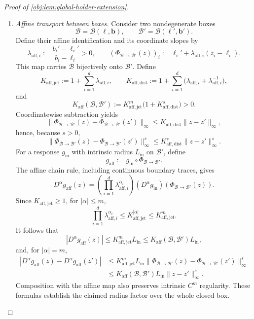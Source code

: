 \begin{proof}[Proof of \cref{obj:lem:global-holder-extension}]
\begin{enumerate}
\item\label{proof:global-holder-extension:affine-transport} \emph{Affine transport between boxes.}
Consider two nondegenerate boxes
\[
\mathcal B=\mathcal B(\boldsymbol\ell,\boldsymbol b),
\qquad
\mathcal B'=\mathcal B(\boldsymbol\ell',\boldsymbol b').
\]
Define their affine identification and its coordinate slopes by
\[
\lambda_{\mathrm{aff},i}
:=\frac{b_i'-\ell_i'}{b_i-\ell_i}>0,
\qquad
(\Phi_{\mathcal B\to\mathcal B'}(z))_i
:=\ell_i'+\lambda_{\mathrm{aff},i}(z_i-\ell_i).
\]
This map carries \(\mathcal B\) bijectively onto \(\mathcal B'\). Define
\[
K_{\mathrm{aff},\mathrm{jet}}
:=1+\sum_{i=1}^d\lambda_{\mathrm{aff},i},
\qquad
K_{\mathrm{aff},\mathrm{dist}}
:=1+\sum_{i=1}^d
\bigl(\lambda_{\mathrm{aff},i}+\lambda_{\mathrm{aff},i}^{-1}\bigr),
\]
and
\[
K_{\mathrm{aff}}(\mathcal B,\mathcal B')
:=
K_{\mathrm{aff},\mathrm{jet}}^m
\bigl(1+K_{\mathrm{aff},\mathrm{dist}}^s\bigr)>0.
\]
Coordinatewise subtraction yields
\[
\|\Phi_{\mathcal B\to\mathcal B'}(z)
-\Phi_{\mathcal B\to\mathcal B'}(z')\|_\infty
\le K_{\mathrm{aff},\mathrm{dist}}\|z-z'\|_\infty,
\]
hence, because \(s>0\),
\[
\|\Phi_{\mathcal B\to\mathcal B'}(z)
-\Phi_{\mathcal B\to\mathcal B'}(z')\|_\infty^s
\le K_{\mathrm{aff},\mathrm{dist}}^s\|z-z'\|_\infty^s.
\]
For a response \(g_{\mathrm{in}}\) with intrinsic radius \(L_{\mathrm{in}}\) on \(\mathcal B'\), define
\[
g_{\mathrm{aff}}:=g_{\mathrm{in}}\circ\Phi_{\mathcal B\to\mathcal B'}.
\]
The affine chain rule, including continuous boundary traces, gives
\[
D^\alpha g_{\mathrm{aff}}(z)
=
\left(\prod_{i=1}^d\lambda_{\mathrm{aff},i}^{\alpha_i}\right)
(D^\alpha g_{\mathrm{in}})
(\Phi_{\mathcal B\to\mathcal B'}(z)).
\]
Since \(K_{\mathrm{aff},\mathrm{jet}}\ge1\), for \(|\alpha|\le m\),
\[
\prod_{i=1}^d\lambda_{\mathrm{aff},i}^{\alpha_i}
\le K_{\mathrm{aff},\mathrm{jet}}^{|\alpha|}
\le K_{\mathrm{aff},\mathrm{jet}}^m.
\]
It follows that
\[
|D^\alpha g_{\mathrm{aff}}(z)|
\le K_{\mathrm{aff},\mathrm{jet}}^mL_{\mathrm{in}}
\le K_{\mathrm{aff}}(\mathcal B,\mathcal B')L_{\mathrm{in}},
\]
and, for \(|\alpha|=m\),
\[
\begin{aligned}
|D^\alpha g_{\mathrm{aff}}(z)-D^\alpha g_{\mathrm{aff}}(z')|
&\le K_{\mathrm{aff},\mathrm{jet}}^mL_{\mathrm{in}}
\|\Phi_{\mathcal B\to\mathcal B'}(z)
-\Phi_{\mathcal B\to\mathcal B'}(z')\|_\infty^s\\
&\le K_{\mathrm{aff}}(\mathcal B,\mathcal B')L_{\mathrm{in}}
\|z-z'\|_\infty^s.
\end{aligned}
\]
Composition with the affine map also preserves intrinsic \(C^m\) regularity. These formulas establish the claimed radius factor over the whole closed box.


\end{enumerate}
\end{proof}
